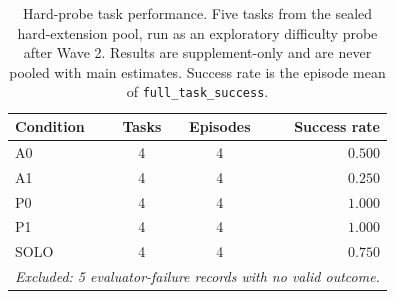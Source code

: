 \begin{table}[ht]
\centering
\caption{Hard-probe task performance.
  Five tasks from the sealed hard-extension pool, run as an exploratory difficulty
  probe after Wave 2. Results are supplement-only and are never pooled with main
  estimates. Success rate is the episode mean of \texttt{full\_task\_success}.}
\label{tab:hard_probe}
\begin{tabular}{lccr}
\toprule
Condition & Tasks & Episodes & Success rate \\
\midrule
  A0 & 4 & 4 & $0.500$ \\
  A1 & 4 & 4 & $0.250$ \\
  P0 & 4 & 4 & $1.000$ \\
  P1 & 4 & 4 & $1.000$ \\
  SOLO & 4 & 4 & $0.750$ \\
  \multicolumn{4}{l}{\textit{Excluded: 5 evaluator-failure records with no valid outcome.}} \\
\bottomrule
\end{tabular}
\end{table}
